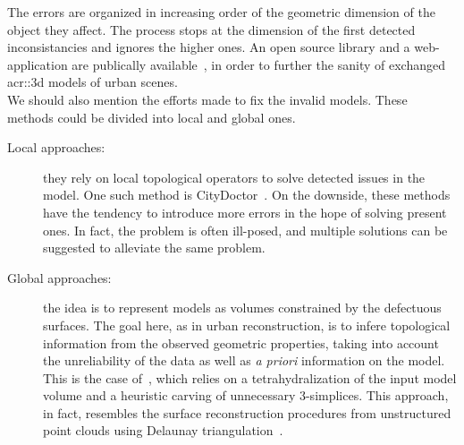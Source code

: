         The errors are organized in increasing order of the geometric dimension of the object they affect.
        The process stops at the dimension of the first detected inconsistancies and ignores the higher ones. 
        An open source library and a web-application are publically available~\parencite{ledoux2018val3dity}, in order to further the sanity of exchanged \gls{acr::3d} models of urban scenes.\\

        We should also mention the efforts made to fix the invalid models. 
        These methods could be divided into local and global ones.
        \begin{description}
            \item[Local approaches:] they rely on local topological operators to solve detected issues in the model.
                    One such method is CityDoctor~\parencite{alam2014towards}.
                    On the downside, these methods have the tendency to introduce more errors in the hope of solving present ones.
                    In fact, the problem is often ill-posed, and multiple solutions can be suggested to alleviate the same problem.
            \item[Global approaches:] the idea is to represent models as volumes constrained by the defectuous surfaces.
                    The goal here, as in urban reconstruction, is to infere topological information from the observed geometric properties, taking into account the unreliability of the data as well as \textit{a priori} information on the model.
                    This is the case of~\textcite{zhao2013automatic}, which relies on a tetrahydralization of the input model volume and a heuristic carving of unnecessary 3-simplices.
                    This approach, in fact, resembles the surface reconstruction procedures from unstructured point clouds using Delaunay triangulation~\parencite{cazals2006delaunay, berger2014state}.
        \end{description}

